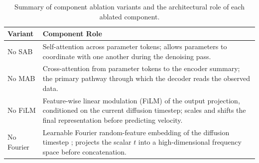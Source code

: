 \begin{table}[t]
\centering
\caption{Summary of component ablation variants and the architectural role of each
ablated component.}
\label{tab:component_ablation_summary}
\begin{tabularx}{\textwidth}{>{\raggedright\arraybackslash}l >{\raggedright\arraybackslash}X}
\toprule
Variant & Component Role \\
\midrule
No SAB
  & Self-attention across parameter tokens; allows parameters to coordinate
    with one another during the denoising pass. \\[4pt]
No MAB
  & Cross-attention from parameter tokens to the encoder summary; the primary
    pathway through which the decoder reads the observed data. \\[4pt]
No FiLM
  & Feature-wise linear modulation (FiLM) of the output projection,
    conditioned on the current diffusion timestep; scales and shifts the
    final representation before predicting velocity. \\[4pt]
No Fourier
  & Learnable Fourier random-feature embedding of the diffusion timestep
    \citep{tancik2020fourier}; projects the scalar $t$ into a
    high-dimensional frequency space before concatenation. \\
\bottomrule
\end{tabularx}
\end{table}
